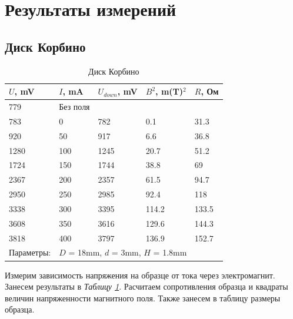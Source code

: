 \documentclass[a4paper]{article}
\begin{document}
\section{Результаты измерений}
\subsection{Диск Корбино}

\begin{table}[ht]
\begin{minipage}{0.7\textwidth}
    \centering
    \begin{tabular}{|l|l|l|l|l|}
    \hline
    $U$, mV    & $I$, mA  & $U_{down}$,  mV & $B^2$,  m(T)$^2$ & $R$, Ом \\ \hline
    779        & Без поля &                 &                  &         \\ \hline
    783        & 0        & 782             & 0.1              & 31.3    \\ \hline
    920        & 50       & 917             & 6.6              & 36.8    \\ \hline
    1280       & 100      & 1245            & 20.7             & 51.2    \\ \hline
    1724       & 150      & 1744            & 38.8             & 69      \\ \hline
    2367       & 200      & 2357            & 61.5             & 94.7    \\ \hline
    2950       & 250      & 2985            & 92.4             & 118     \\ \hline
    3338       & 300      & 3395            & 114.2            & 133.5   \\ \hline
    3608       & 350      & 3616            & 129.6            & 144.3   \\ \hline
    3818       & 400      & 3797            & 136.9            & 152.7   \\ \hline
    Параметры: & \multicolumn{4}{l|}{$D$ = 18mm, $d$ = 3mm, $H$ = 1.8mm} \\ \hline
    \end{tabular}
    \label{table::ring}
    \caption{Диск Корбино}
\end{minipage}
\begin{minipage}{0.3\textwidth}
    Измерим зависимость напряжения на образце от тока через электромагнит. Занесем результаты в \textit{Таблицу \ref{table::ring}}. Расчитаем сопротивления образца и квадраты величин напряженности магнитного поля. Также занесем в таблицу размеры образца.
\end{minipage}
\end{table}
\end{document}
